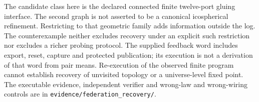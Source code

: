 The candidate class here is the declared connected finite twelve-port
gluing interface. The second graph is not asserted to be a canonical
icospherical refinement. Restricting to that geometric family adds
information outside the log. The counterexample neither excludes recovery
under an explicit such restriction nor excludes a richer probing protocol.
The supplied feedback word includes export, reset, capture and protected
publication; its execution is not a derivation of that word from pair means.
Re-execution of the observed finite program cannot establish recovery of
unvisited topology or a universe-level fixed point. The executable evidence,
independent verifier and wrong-law and wrong-wiring controls are in
\texttt{evidence/federation\_recovery/}.

